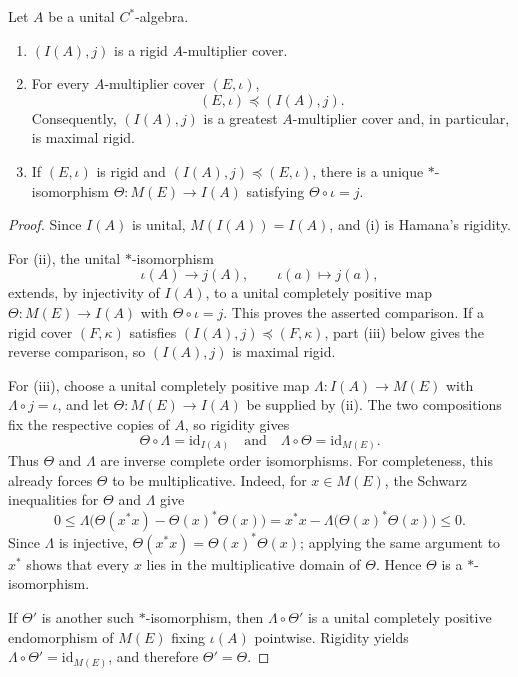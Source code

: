 \documentclass[10pt,a4paper]{amsart}
\newcommand{\Id}{\mathrm{id}}
\begin{document}
\begin{proposition}\label{prop:three-parts}
Let $A$ be a unital $C^*$-algebra.
\begin{enumerate}[label=\textup{(\roman*)},leftmargin=2.5em]
\item $(I(A),j)$ is a rigid $A$-multiplier cover.
\item For every $A$-multiplier cover $(E,\iota)$,
\[
(E,\iota)\preccurlyeq(I(A),j).
\]
Consequently, $(I(A),j)$ is a greatest $A$-multiplier cover and, in particular, is maximal rigid.
\item If $(E,\iota)$ is rigid and $(I(A),j)\preccurlyeq(E,\iota)$, there is a unique $*$-isomorphism $\Theta\colon M(E)\to I(A)$ satisfying $\Theta\circ\iota=j$.
\end{enumerate}
\end{proposition}

\begin{proof}
Since $I(A)$ is unital, $M(I(A))=I(A)$, and (i) is Hamana's rigidity.

For (ii), the unital $*$-isomorphism
\[
\iota(A)\longrightarrow j(A),\qquad \iota(a)\longmapsto j(a),
\]
extends, by injectivity of $I(A)$, to a unital completely positive map $\Theta\colon M(E)\to I(A)$ with $\Theta\circ\iota=j$. This proves the asserted comparison. If a rigid cover $(F,\kappa)$ satisfies $(I(A),j)\preccurlyeq(F,\kappa)$, part (iii) below gives the reverse comparison, so $(I(A),j)$ is maximal rigid.

For (iii), choose a unital completely positive map $\Lambda\colon I(A)\to M(E)$ with $\Lambda\circ j=\iota$, and let $\Theta\colon M(E)\to I(A)$ be supplied by (ii). The two compositions fix the respective copies of $A$, so rigidity gives
\[
\Theta\circ\Lambda=\Id_{I(A)}
\quad\text{and}\quad
\Lambda\circ\Theta=\Id_{M(E)}.
\]
Thus $\Theta$ and $\Lambda$ are inverse complete order isomorphisms. For completeness, this already forces $\Theta$ to be multiplicative. Indeed, for $x\in M(E)$, the Schwarz inequalities for $\Theta$ and $\Lambda$ give
\[
0\leqslant \Lambda\bigl(\Theta(x^*x)-\Theta(x)^*\Theta(x)\bigr)
=x^*x-\Lambda\bigl(\Theta(x)^*\Theta(x)\bigr)\leqslant 0.
\]
Since $\Lambda$ is injective, $\Theta(x^*x)=\Theta(x)^*\Theta(x)$; applying the same argument to $x^*$ shows that every $x$ lies in the multiplicative domain of $\Theta$. Hence $\Theta$ is a $*$-isomorphism.

If $\Theta'$ is another such $*$-isomorphism, then $\Lambda\circ\Theta'$ is a unital completely positive endomorphism of $M(E)$ fixing $\iota(A)$ pointwise. Rigidity yields $\Lambda\circ\Theta'=\Id_{M(E)}$, and therefore $\Theta'=\Theta$.
\end{proof}
\end{document}
